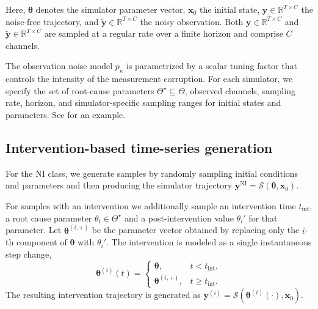 Here, \(\boldsymbol{\theta}\) denotes the simulator parameter vector, \(\mathbf{x}_0\) the initial state, \(\mathbf{y}\in\mathbb{R}^{T\times C}\) the noise-free trajectory, and \(\tilde{\mathbf{y}}\in\mathbb{R}^{T\times C}\) the noisy observation.
Both \(\mathbf{y}\in\mathbb{R}^{T\times C}\) and \(\tilde{\mathbf{y}}\in\mathbb{R}^{T\times C}\) are sampled at a regular rate over a finite horizon and comprise \(C\) channels. 

The observation noise model \(p_\kappa\) is parametrized by a scalar tuning factor that controls the intensity of the measurement corruption.
For each simulator, we specify the set of root-cause parameters \(\Theta^\star \subseteq \Theta\), observed channels, sampling rate, horizon, and simulator-specific sampling ranges for initial states and parameters.
See  for an example.

\subsection{Intervention-based time-series generation}
For the \(\mathrm{NI}\) class, we generate samples by randomly sampling initial conditions and parameters and then producing the simulator trajectory \(\mathbf{y}^{\mathrm{NI}} = \mathcal{S}(\boldsymbol{\theta}, \mathbf{x}_0)\).

For samples with an intervention we additionally sample an intervention time $t_{\mathrm{int}}$, a root cause parameter \(\theta_i \in \Theta^\star\) and a post-intervention value $\theta_i'$ for that parameter.
Let \(\boldsymbol{\theta}^{(i,+)}\) be the parameter vector obtained by replacing only the \(i\)-th component of \(\boldsymbol{\theta}\) with \(\theta_i'\).
The intervention is modeled as a single instantaneous step change,
\[
    \boldsymbol{\theta}^{(i)}(t) =
    \begin{cases}
        \boldsymbol{\theta}, & t < t_{\mathrm{int}},\\
        \boldsymbol{\theta}^{(i,+)}, & t \geq t_{\mathrm{int}}.
    \end{cases}
\]
The resulting intervention trajectory is generated as \(\mathbf{y}^{(i)} = \mathcal{S}(\boldsymbol{\theta}^{(i)}(\cdot), \mathbf{x}_0)\).

